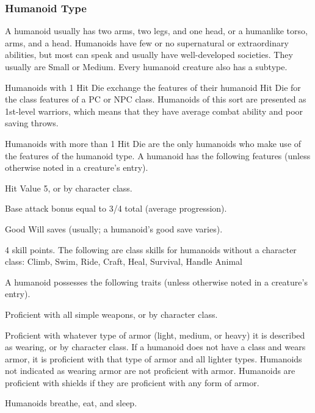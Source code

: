 \subsubsection{Humanoid Type} A humanoid usually has two arms, two legs, and one head, or a humanlike torso, arms, and a head. Humanoids have few or no supernatural or extraordinary abilities, but most can speak and usually have well-developed societies. They usually are Small or Medium. Every humanoid creature also has a subtype.
\par Humanoids with 1 Hit Die exchange the features of their humanoid Hit Die for the class features of a PC or NPC class. Humanoids of this sort are presented as 1st-level warriors, which means that they have average combat ability and poor saving throws.
\par Humanoids with more than 1 Hit Die are the only humanoids who make use of the features of the humanoid type.
 A humanoid has the following features (unless otherwise noted in a creature's entry).
\begin{itemize*}
\item Hit Value 5, or by character class.
\item Base attack bonus equal to 3/4 total  (average progression).
\item Good Will saves (usually; a humanoid's good save varies).
\item 4 skill points. The following are class skills for humanoids without a character class: Climb, Swim, Ride, Craft, Heal, Survival, Handle Animal
\end{itemize*}
 A humanoid possesses the following traits (unless otherwise noted in a creature's entry).
\begin{itemize*}
\item Proficient with all simple weapons, or by character class.
\item Proficient with whatever type of armor (light, medium, or heavy) it is described as wearing, or by character class. If a humanoid does not have a class and wears armor, it is proficient with that type of armor and all lighter types. Humanoids not indicated as wearing armor are not proficient with armor. Humanoids are proficient with shields if they are proficient with any form of armor.
\item Humanoids breathe, eat, and sleep.
\end{itemize*}

